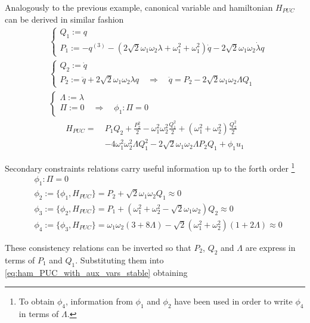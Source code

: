 Analogously to the previous example, canonical variable and hamiltonian
$H_{PUC}$ can be derived in similar fashion
\begin{align*}
  & \begin{cases}
    Q_1 := q \\
    P_1 := - q^{(3)} -
    \left( 2\sqrt{2} \omega_1\omega_2\lambda + \omega_1^2 + \omega_1^2 \right)
    \dot{q} - 2\sqrt{2}\omega_1\omega_2\dot{\lambda} q
  \end{cases} \\
  & \begin{cases}
    Q_2 := \dot{q} \\
    P_2 := \ddot{q} + 2\sqrt{2} \omega_1\omega_2\lambda q
    \quad \Rightarrow \quad
    \ddot{q} = P_2 - 2\sqrt{2} \omega_1\omega_2\Lambda Q_1
  \end{cases} \\
  & \begin{cases}
    \Lambda := \lambda \\
    \Pi := 0
    \quad  \Rightarrow \quad \phi_1: \Pi = 0
  \end{cases}
\end{align*}
\begin{align} \label{eq:ham_PUC_with_aux_vars_stable}
  H_{PUC} =\ & P_1 Q_2 + \frac{P_2^2}{2} -
  \omega_1^2\omega_2^2\frac{Q_1^2}{2} +
  \left( \omega_1^2 + \omega_2^2 \right) \frac{Q_2^2}{2} \\
  & - 4 \omega_1^2\omega_2^2\Lambda Q_1^2 -
  2\sqrt{2}\omega_1\omega_2\Lambda P_2 Q_1 + \phi_1 u_1
\end{align}

Secondary constraints relations carry useful information up to the forth order
\footnote{
  To obtain $\phi_4$, information from $\phi_1$ and $\phi_2$ have been used in
  order to write $\phi_4$ in terms of $\Lambda$.
}
\begin{align*}
  & \phi_1 : \Pi = 0 \\
  & \phi_2 := \{\phi_1, H_{PUC}\} =
    P_2 + \sqrt{2} \omega_1\omega_2 Q_1 \approx 0 \\
  & \phi_3 := \{\phi_2, H_{PUC}\} =
    P_1 + \left(\omega_1^2 + \omega_2^2 - \sqrt{2}\omega_1\omega_2 \right) Q_2
    \approx 0 \\
  & \phi_4 := \{\phi_3, H_{PUC}\} =
  \omega_1 \omega_2 (3+8\Lambda) - \sqrt{2}
  \left( \omega_1^2 + \omega_2^2 \right) \left(1 + 2\Lambda \right) \approx 0
\end{align*}

These consistency relations can be inverted so that $P_2$, $Q_2$ and $\Lambda$
are express in terms of $P_1$ and $Q_1$. Substituting them into
\eqref{eq:ham_PUC_with_aux_vars_stable} obtaining

